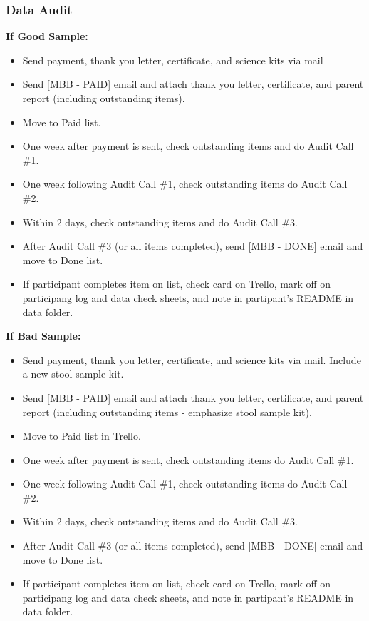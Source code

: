 \documentclass[]{book}
\begin{document}
\hypertarget{data-audit-2}{%
\subsubsection{Data Audit}\label{data-audit-2}}

\textbf{If Good Sample:}

\begin{itemize}
\item
  Send payment, thank you letter, certificate, and science kits via mail
\item
  Send {[}MBB - PAID{]} email and attach thank you letter, certificate, and parent report (including outstanding items).
\item
  Move to Paid list.
\item
  One week after payment is sent, check outstanding items and do Audit Call \#1.
\item
  One week following Audit Call \#1, check outstanding items do Audit Call \#2.
\item
  Within 2 days, check outstanding items and do Audit Call \#3.
\item
  After Audit Call \#3 (or all items completed), send {[}MBB - DONE{]} email and move to Done list.
\item
  If participant completes item on list, check card on Trello, mark off on participang log and data check sheets, and note in partipant's README in data folder.
\end{itemize}

\textbf{If Bad Sample:}

\begin{itemize}
\item
  Send payment, thank you letter, certificate, and science kits via mail. Include a new stool sample kit.
\item
  Send {[}MBB - PAID{]} email and attach thank you letter, certificate, and parent report (including outstanding items - emphasize stool sample kit).
\item
  Move to Paid list in Trello.
\item
  One week after payment is sent, check outstanding items do Audit Call \#1.
\item
  One week following Audit Call \#1, check outstanding items do Audit Call \#2.
\item
  Within 2 days, check outstanding items and do Audit Call \#3.
\item
  After Audit Call \#3 (or all items completed), send {[}MBB - DONE{]} email and move to Done list.
\item
  If participant completes item on list, check card on Trello, mark off on participang log and data check sheets, and note in partipant's README in data folder.
\end{itemize}
\end{document}
